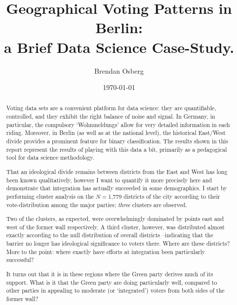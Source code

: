 \documentclass[amsmath,amssymb,nofootinbib,12pt,preprint]{revtex4}
\begin{document}
\title{Geographical Voting Patterns in Berlin: \\ a Brief Data Science Case-Study.  }
\author{Brendan Osberg}

\date{\today}

\begin{abstract}

Voting data sets are a convenient platform for data science: they are quantifiable, controlled, and they exhibit the right balance of noise and signal. In Germany, in particular, the compulsory `Wohnmeldungs' allow for very detailed information in each riding. Moreover, in Berlin (as well as at the national level), the historical East/West divide provides a prominent feature for binary classification.
The results shown in this report represent the results of playing with this data a bit, primarily as a pedagogical tool for data science methodology.


That an ideological divide remains  between districts from the East and West has long been known qualitatively, however I want to  quantify it more precisely here and demonstrate that integration has actually succeeded in some demographics.
I start by performing cluster analysis on the $N=$1,779 districts of the city according to their vote-distribution among the major parties; \emph{three} clusters are observed. 

Two of the clusters, as expected, were overwhelmingly dominated by points east and west of the former wall respectively. A third cluster, however, was distributed almost exactly according to the null distribution of overall districts \---indicating that the barrier no longer has ideological significance to voters there. Where are these districts? More to the point: where exactly have efforts at integration been particularly successful? 

It turns out that it is in these regions where the Green party derives much of its support. What is it that the Green party are doing particularly well, compared to other parties in appealing to moderate (or `integrated') voters from both sides of the former wall?

\end{abstract}

\maketitle
\end{document}

